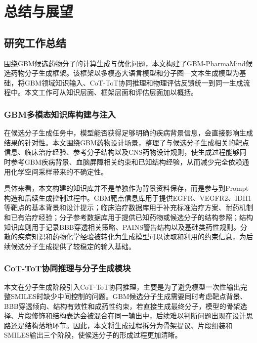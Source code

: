 \chapter{总结与展望}\label{chap:conclusion}

\section{研究工作总结}\label{sec:summary-work}

围绕GBM候选药物分子的计算生成与优化问题，本文构建了GBM-PharmaMind候选药物分子生成框架。该框架以多模态大语言模型和分子图—文本生成模型为基础，将GBM领域知识输入、CoT-ToT协同推理和物理评估反馈统一到同一生成流程中。本文工作可从知识层面、框架层面和评估层面加以概括。

\subsection{GBM多模态知识库构建与注入}\label{sec:work-km}

在候选分子生成任务中，模型能否获得足够明确的疾病背景信息，会直接影响生成结果的针对性。本文围绕GBM药物设计场景，整理了与候选分子生成相关的靶点信息、临床治疗经验、参考分子结构以及CNS药物设计规则，使生成过程能够同时参考GBM疾病背景、血脑屏障相关约束和已知结构经验，从而减少完全依赖通用化学空间采样带来的不确定性。

具体来看，本文构建的知识库并不是单独作为背景资料保存，而是参与到Prompt构造和后续生成控制过程中。GBM靶点信息库用于提供EGFR、VEGFR2、IDH1等靶点的基本背景和设计提示；临床治疗数据库用于补充标准治疗方案、耐药机制和已有治疗经验；分子参考数据库用于提供已知药物或候选分子的结构参照；结构知识库则用于记录BBB穿透相关策略、PAINS警告结构以及基础类药性规则。分散的疾病知识和药物化学经验被转化为生成模型可以读取和利用的约束信息，为后续候选分子生成提供了较稳定的输入基础。

\subsection{CoT-ToT协同推理与分子生成模块}\label{sec:work-cot-tot}

本文在分子生成阶段引入CoT-ToT协同推理，主要是为了避免模型一次性输出完整SMILES时缺少中间控制的问题。GBM候选分子生成需要同时考虑靶点背景、BBB穿透倾向、结构有效性和成药性约束，若直接生成最终分子，模型的骨架选择、片段修饰和结构表达会被混合在同一输出中，后续难以判断问题出现在设计思路还是结构落地环节。因此，本文将生成过程拆分为骨架提议、片段组装和SMILES输出三个阶段，使候选分子的形成过程更加清晰。

